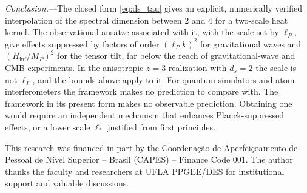 \documentclass[aps,prl,reprint,twocolumn,superscriptaddress,nofootinbib,floatfix]{revtex4-2}
\begin{document}
\emph{Conclusion.}---The closed form \eqref{eq:ds_tau} gives an explicit, numerically verified interpolation of the spectral dimension between $2$ and $4$ for a two-scale heat kernel. The observational ans\"atze associated with it, with the scale set by $\ell_P$, give effects suppressed by factors of order $(\ell_P k)^2$ for gravitational waves and $(H_{\mathrm{inf}}/M_P)^2$ for the tensor tilt, far below the reach of gravitational-wave and CMB experiments. In the anisotropic $z = 3$ realization with $d_s = 2$ the scale is not $\ell_P$, and the bounds above apply to it. For quantum simulators and atom interferometers the framework makes no prediction to compare with. The framework in its present form makes no observable prediction. Obtaining one would require an independent mechanism that enhances Planck-suppressed effects, or a lower scale $\ell_\ast$ justified from first principles.

\begin{acknowledgments}
This research was financed in part by the Coordena\c{c}\~ao de Aperfei\c{c}oamento de Pessoal de N\'ivel Superior -- Brasil (CAPES) -- Finance Code 001. The author thanks the faculty and researchers at UFLA PPGEE/DES for institutional support and valuable discussions.
\end{acknowledgments}


\end{document}
